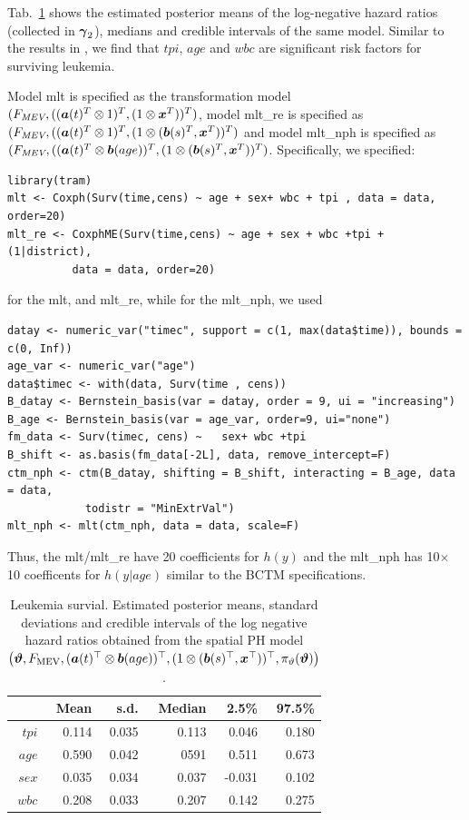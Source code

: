 \documentclass[12pt, a4paper]{article}
\newcommand{\bctm}[2]{\big( \varthetavec, \allowbreak {#1},\allowbreak {#2}, \allowbreak\pi_\vartheta(\varthetavec)\big)}
\begin{document}
Tab.~\ref{tab:leuk} shows the estimated posterior means of the log-negative hazard ratios (collected in $\text{\boldmath$\gamma$}_2$), medians and credible intervals of the same model. Similar to the results in \cite{spbayessurv}, we find that $\mathit{tpi}$,  $\mathit{age}$ and $\mathit{wbc}$ are significant risk factors for surviving leukemia.

Model mlt is specified as the transformation model $(F_\textit{MEV}, ((\text{\boldmath$a$}(t)^T \otimes 1)^T, (1 \otimes \text{\boldmath$x$}^T))^T)$, model mlt\_re is specified as $(F_\textit{MEV}, ((\text{\boldmath$a$}(t)^T \otimes 1)^T, (1 \otimes (\text{\boldmath$b$}(s)^T, \text{\boldmath$x$}^T))^T)$ and model mlt\_nph is specified as  $(F_\textit{MEV}, ((\text{\boldmath$a$}(t)^T \otimes \text{\boldmath$b$}(age))^T, (1 \otimes (\text{\boldmath$b$}(s)^T, \text{\boldmath$x$}^T))^T)$. Specifically, we specified:
\begin{verbatim}
library(tram)
mlt <- Coxph(Surv(time,cens) ~ age + sex+ wbc + tpi , data = data, order=20)
mlt_re <- CoxphME(Surv(time,cens) ~ age + sex + wbc +tpi + (1|district), 
          data = data, order=20)
\end{verbatim}
for the mlt, and mlt\_re, while for the mlt\_nph, we used
\begin{verbatim}
datay <- numeric_var("timec", support = c(1, max(data$time)), bounds = c(0, Inf)) 
age_var <- numeric_var("age")
data$timec <- with(data, Surv(time , cens))
B_datay <- Bernstein_basis(var = datay, order = 9, ui = "increasing") 
B_age <- Bernstein_basis(var = age_var, order=9, ui="none")
fm_data <- Surv(timec, cens) ~   sex+ wbc +tpi 
B_shift <- as.basis(fm_data[-2L], data, remove_intercept=F) 
ctm_nph <- ctm(B_datay, shifting = B_shift, interacting = B_age, data = data, 
            todistr = "MinExtrVal")
mlt_nph <- mlt(ctm_nph, data = data, scale=F)
\end{verbatim}
Thus, the mlt/mlt\_re have 20 coefficients for $h(y)$ and the mlt\_nph has 10$\times$ 10 coefficents for $h(y|age)$ similar to the BCTM specifications. 
 \begin{table}
 \centering
 \begin{tabular}{rrrrrr}
   \hline\hline
  & Mean & s.d. & Median & 2.5\% & 97.5\% \\
   \hline
 $\mathit{tpi}$ & 0.114 & 0.035 & 0.113 & 0.046 & 0.180 \\
   $\mathit{age}$ & 0.590 & 0.042 & 0591 & 0.511 & 0.673 \\
   $\mathit{sex}$ & 0.035 & 0.034 & 0.037 & -0.031 & 0.102 \\
   $\mathit{wbc}$ & 0.208 & 0.033 & 0.207 & 0.142 & 0.275 \\
   \hline\hline
 \end{tabular}\caption{\small  Leukemia survial. Estimated posterior means, standard deviations and credible intervals of the log negative hazard ratios obtained from the spatial PH model $\bctm{F_{\text{MEV}}}{(\avec(t)^\top \otimes \bvec(age))^\top,(1 \otimes (\bvec(s)^\top, \xvec^\top))^\top}$.} \label{tab:leuk}
\end{table}
\end{document}
